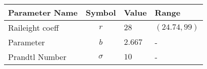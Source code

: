 \begin{tabular}{lcll}
\hline
 Parameter Name   &  Symbol  & Value   & Range         \\
\hline
 Raileight coeff  &   $r$    & $28$    & $(24.74, 99)$ \\
 Parameter        &   $b$    & $2.667$ & -             \\
 Prandtl Number   & $\sigma$ & $10$    & -             \\
\hline
\end{tabular}